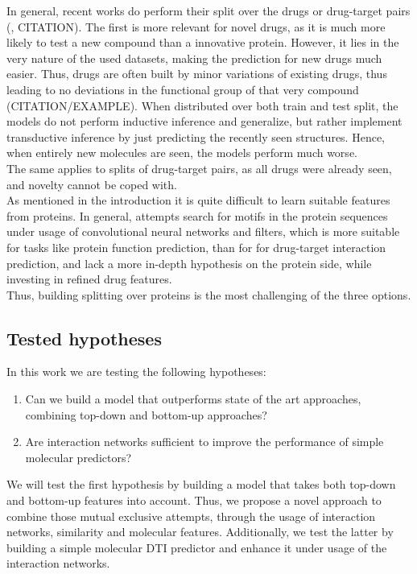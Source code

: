 \documentclass{bioinfo}
\renewcommand{\cite}{\citep}
\begin{document}
In general, recent works do perform their split over the drugs or drug-target pairs (\cite{Survey2018}, CITATION). The first is more relevant for novel drugs, as it is much more likely to test a new compound than a innovative protein. However, it lies in the very nature of the used datasets, making the prediction for new drugs much easier. Thus, drugs are often built by minor variations of existing drugs, thus leading to no deviations in the functional group of that very compound (CITATION/EXAMPLE). When distributed over both train and test split, the models do not perform inductive inference and generalize, but rather implement transductive inference by just predicting the recently seen structures. Hence, when entirely new molecules are seen, the models perform much worse. \\
The same applies to splits of drug-target pairs, as all drugs were already seen, and novelty cannot be coped with.\\
As mentioned in the introduction it is quite difficult to learn suitable features from proteins. In general, attempts search for motifs in the protein sequences under usage of convolutional neural networks and filters, which is more suitable for tasks like protein function prediction, than for for drug-target interaction prediction, and lack a more in-depth hypothesis on the protein side, while investing in refined drug features. \\
Thus, building splitting over proteins is the most challenging of the three options. \\

\subsection{Tested hypotheses}

In this work we are testing the following hypotheses:
\begin{enumerate}
	\item Can we build a model that outperforms state of the art approaches, combining top-down and bottom-up approaches?
	\item Are interaction networks sufficient to improve the performance of simple molecular predictors?
\end{enumerate}
We will test the first hypothesis by building a model that takes both top-down and bottom-up features into account. Thus, we propose a novel approach to combine those mutual exclusive attempts, through the usage of interaction networks, similarity and molecular features. Additionally, we test the latter by building a simple molecular DTI predictor and enhance it under usage of the interaction networks.\\
\end{document}

